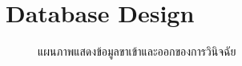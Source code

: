 \documentclass[12pt,oneside,openright,a4paper]{cpe-thai-project}
\begin{document}
 
\section{Database Design}
\begin{figure}[!ht]\centering
    \setlength{\fboxrule}{0.2mm} %
    \setlength{\fboxsep}{1cm}
    \caption{แผนภาพแสดงข้อมูลขาเข้าและออกของการวินิจฉัย}\label{fig:system}
   \end{figure}
   
\newpage
\end{document}
